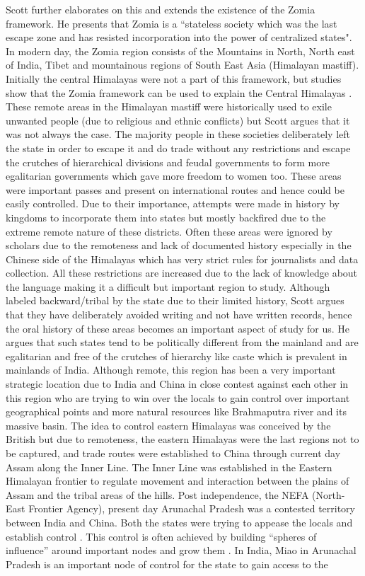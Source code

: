\begin{sloppypar}
Scott \citep{jamesscott} further elaborates on this and extends the existence of the Zomia framework. He presents that Zomia is a ``stateless society which was the last escape zone and has resisted incorporation into the power of centralized states". In modern day, the Zomia region consists of the Mountains in North, North east of India, Tibet and mountainous regions of South East Asia (Himalayan mastiff). Initially the central Himalayas were not a part of this framework, but studies  show that the Zomia framework can be used to explain the Central Himalayas \citep{shneiderman2010central}. These remote areas in the Himalayan mastiff were historically used to exile unwanted people (due to religious and ethnic conflicts) but Scott argues that it was not always the case. The majority people in these societies deliberately left the state in order to escape it and do trade without any restrictions and escape the crutches of hierarchical divisions and feudal governments to form more egalitarian governments which gave more freedom to women too. These areas were important passes and present on international routes and hence could be easily controlled. Due to their importance, attempts were made in history by kingdoms to incorporate them into states but mostly backfired due to the extreme remote nature of these districts. Often these areas were ignored by scholars due to the remoteness and lack of documented history especially in the Chinese side of the Himalayas which has very strict rules for journalists and data collection. All these restrictions are increased due to the lack of knowledge about the language making it a difficult but important region to study. Although labeled backward/tribal by the state due to their limited history, Scott argues that they have deliberately avoided writing and not have written records, hence the oral history of these areas becomes an important aspect of study for us. He argues that such states tend to be politically different from the mainland and are egalitarian and free of the crutches of hierarchy like caste which is prevalent in mainlands of India. Although remote, this region has been a very important strategic location due to India and China in close contest against each other in this region who are trying to win over the locals to gain control over important geographical points  and more natural resources like Brahmaputra river and its massive basin. The idea to control eastern Himalayas was conceived by the British but due to remoteness, the eastern Himalayas were the last regions not to be captured, and trade routes were established to China through current day Assam along the Inner Line. The Inner Line was established in the Eastern Himalayan frontier to regulate movement and interaction between the plains of Assam and the tribal areas of the hills. Post independence, the NEFA (North-East Frontier Agency), present day Arunachal Pradesh was a contested territory between India and China. Both the states were trying to appease the locals and establish control \citep{guyot2017shadow}. This control is often achieved by building \enquote{spheres of influence} around important nodes and grow them \citep{Farrelly_2013b}. In India, Miao in Arunachal Pradesh is an important node of control for the state to gain access to the 
\end{sloppypar}
